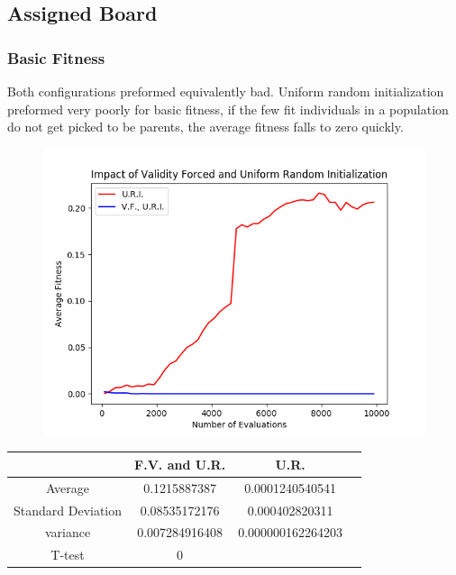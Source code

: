 \documentclass{article}
\begin{document}
	\subsection{Assigned Board}

		\subsubsection{Basic Fitness}
			Both configurations preformed equivalently bad. Uniform random initialization preformed
			very poorly for basic fitness, if the few fit individuals in a population 
			do not get picked to be parents, the average fitness falls to zero quickly.

			\begin{figure}[!htb]
			\centering
			\includegraphics[scale=0.4]{q2_assigned_board_basic_ur_vs_vfur.png}
			\end{figure}
			\begin{center}
			\begin{tabular}{ || c | c | c | c ||}
			\hline
			       & F.V. and U.R. & U.R.\\ 
			 \hline\hline
			 Average & 0.1215887387 &	0.0001240540541 \\ 
			 \hline
			 Standard Deviation &	0.08535172176	& 0.000402820311
					 \\
			 \hline
			 variance &	0.007284916408 &	0.000000162264203 \\
			 \hline
			 T-test &	0	& \\
			 \hline
			\end{tabular}
			\end{center}
\clearpage
\end{document}
